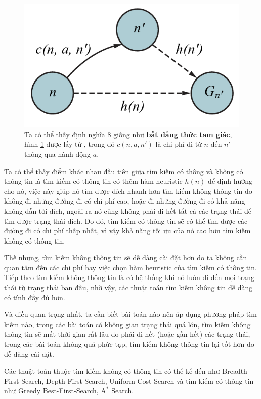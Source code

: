 \begin{figure}[H]
    \centering
    \includegraphics[scale=0.65]{figure/consistent.png}
    \caption{ Ta có thể thấy định nghĩa $8$ giống như \textbf{bất đẳng thức tam giác}, hình \ref{fig:consistent} được lấy từ \cite{Russell_Norvig_Chang_2022}, trong đó $c(n, a, n')$ là chi phí đi từ $n$ đến $n'$ thông qua hành động $a$.}
    \label{fig:consistent}
\end{figure}

Ta có thể thấy điểm khác nhau đầu tiên giữa tìm kiếm có thông và không có thông tin là tìm kiếm có thông tin có thêm hàm heuristic $h(n)$ để định hướng cho nó, việc này giúp nó tìm được đích nhanh hơn tìm kiếm không thông tin do không đi những đường đi có chi phí cao, hoặc đi những đường đi có khả năng không dẫn tới đích, ngoài ra nó cũng không phải đi hết tất cả các trạng thái để tìm được trạng thái đích. Do đó, tìm kiếm có thông tin sẽ có thể tìm được các đường đi có chi phí thấp nhất, vì vậy khả năng tối ưu của nó cao hơn tìm kiếm không có thông tin.
\vspace{7pt}

Thế nhưng, tìm kiếm không thông tin sẽ dễ dàng cài đặt hơn do ta không cần quan tâm đến các chi phí hay việc chọn hàm heuristic của tìm kiếm có thông tin. Tiếp theo tìm kiếm không thông tin là có hệ thống khi nó luôn đi đến mọi trạng thái từ trạng thái ban đầu, nhờ vậy, các thuật toán tìm kiếm không tin dễ dàng có tính đầy đủ hơn.
\vspace{7pt}

Và điều quan trọng nhất, ta cần biết bài toán nào nên áp dụng phương pháp tìm kiếm nào, trong các bài toán có không gian trạng thái quá lớn, tìm kiếm không thông tin sẽ mất thời gian rất lâu do phải đi hết (hoặc gần hết) các trạng thái, trong các bài toán không quá phức tạp, tìm kiếm không thông tin lại tốt hơn do dễ dàng cài đặt.
\vspace{7pt}

Các thuật toán thuộc tìm kiếm không có thông tin có thể kể đến như Breadth-First-Search, Depth-First-Search, Uniform-Cost-Search và tìm kiếm có thông tin như Greedy Best-First-Search, $\text{A}^*$ Search.
